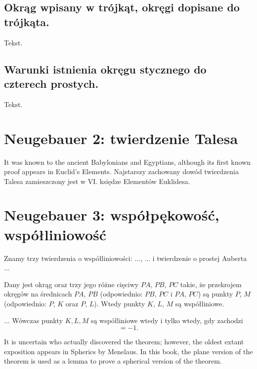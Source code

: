 \documentclass{parchment}
\begin{document}
\section{Okrąg wpisany w trójkąt, okręgi dopisane do trójkąta.}
Tekst.

\section{Warunki istnienia okręgu stycznego do czterech prostych.}
Tekst.




\chapter{Neugebauer 2: twierdzenie Talesa}

It was known to the ancient Babylonians and Egyptians, although its first known proof appears in Euclid's Elements. 
Najstarszy zachowany dowód twierdzenia Talesa zamieszczony jest w VI. księdze Elementów Euklidesa. 










\chapter{Neugebauer 3: współpękowość, współliniowość}

Znamy trzy twierdzenia o współliniowości: ..., ... i twierdzenie o prostej Auberta ...

\begin{proposition}
	Dany jest okrąg oraz trzy jego różne cięciwy $PA$, $PB$, $PC$ takie, że przekrojem okręgów na średnicach $PA$, $PB$ (odpowiednio: $PB$, $PC$ i $PA$, $PC$) są punkty $P$, $M$ (odpowiednio: $P$, $K$ oraz $P$, $L$).
	Wtedy punkty $K$, $L$, $M$ są współliniowe.
\end{proposition}

\begin{proposition}
	...
	Wówczas punkty $K, L, M$ są współliniowe wtedy i tylko wtedy, gdy zachodzi
	\begin{equation}
		[AMB] [BKC] [CLA] = -1.
	\end{equation}
\end{proposition}
It is uncertain who actually discovered the theorem; however, the oldest extant exposition appears in Spherics by Menelaus. In this book, the plane version of the theorem is used as a lemma to prove a spherical version of the theorem.
\end{document}

